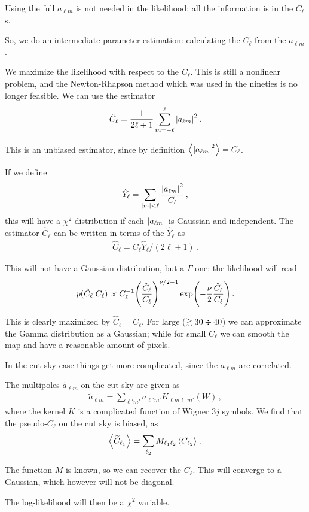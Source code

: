 \documentclass[main.tex]{subfiles}
\begin{document}
Using the full \(a_{\ell m}\) is not needed in the likelihood: all the information is in the \(C_\ell\)s. 

So, we do an intermediate parameter estimation: calculating the \(C_\ell\) from the \(a_{\ell m}\). 

We maximize the likelihood with respect to the \(C_\ell\). 
This is still a nonlinear problem, and the Newton-Rhapson method which was used in the nineties is no longer feasible. 
We can use the estimator 
%
\begin{align}
\hat{C}_\ell = \frac{1}{2 \ell + 1} \sum _{m=- \ell}^{\ell} \abs{a_{\ell m}}^2
\,.
\end{align}

This is an unbiased estimator, since by definition \(\expval{\abs{a_{\ell m}}^2} = C_\ell\). 

If we define 
%
\begin{align}
\hat{Y}_\ell = \sum _{\abs{m} < \ell} \frac{\abs{a_{\ell m}}^2}{C_\ell}
\,,
\end{align}
%
this will have a \(\chi^2\) distribution if each \(\abs{a_{\ell m}}\) is Gaussian and independent. 
The estimator \(\hat{C}_\ell\) can be written in terms of the \(\hat{Y}_\ell\) as 
%
\begin{align}
\hat{C}_\ell = C_\ell \hat{Y}_\ell / (2 \ell + 1)
\,.
\end{align}

This will not have a Gaussian distribution, but a \(\Gamma \) one: the likelihood will read
%
\begin{align}
p(\hat{C}_\ell | C_\ell)
\propto C_\ell^{-1} \qty(\frac{\hat{C}_\ell}{C_\ell})^{\nu / 2 -1}
\exp(- \frac{\nu}{2} \frac{\hat{C}_\ell}{C_\ell})
\,.
\end{align}

This is clearly maximized by \(\hat{C}_\ell = C_\ell\). 
For large (\(\gtrsim 30 \divisionsymbol 40\)) we can approximate the Gamma distribution as a Gaussian; while for small \(C_\ell\) we can smooth the map and have a reasonable amount of pixels. 

In the cut sky case things get more complicated, since the \(a_{\ell m}\) are correlated. 

The multipoles \(\widetilde{a}_{\ell m}\) on the cut sky are given as 
%
\begin{align}
\widetilde{a}_{\ell m} = \sum _{\ell' m'} a_{\ell ' m'} K_{\ell m \ell' m'} (W)
\,,
\end{align}
%
where the kernel \(K\) is a complicated function of Wigner \(3j\) symbols. 
We find that the pseudo-\(C_\ell\) on the cut sky is biased, as 
%
\begin{align}
\expval{\widetilde{C}_{\ell_1}} = \sum _{\ell_2 } M_{\ell_1 \ell_2 } \expval{C_{\ell_2}}
\,.
\end{align}

The function \(M\) is known, so we can recover the \(C_\ell\). 
This will converge to a Gaussian, which however will not be diagonal. 

The log-likelihood will then be a \(\chi^2\) variable. 
\end{document}
